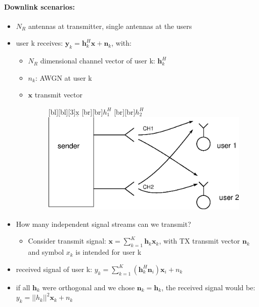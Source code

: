\documentclass[a4paper, 10pt]{article}
\begin{document}
\paragraph{Downlink scenarios:}
\begin{itemize}
	\item $N_R $ antennas at transmitter, single antennas at the users
	\item user k receives: $ \mathbf{y}_k = \mathbf{h}_k^H\mathbf{x} + \mathbf{n}_k $, with:
	\begin{itemize}
		\item $N_R $ dimensional channel vector of user k: $\mathbf{h}_k^H $
		\item $n_k$: AWGN at user k
		\item $\mathbf{x} $ transmit vector  
	\begin{figure}[ht]
		\centering
		[bl][bl][3]{$\underline{\text{x}}$}
		[br][br]{$h_1^H$}
		[br][br]{$h_2^H$}
		\includegraphics[scale=0.8]{BroadcastChannel_scenario.eps}
	\end{figure}
	\end{itemize}
	\item How many independent signal streams can we transmit?
	\begin{itemize}
		\item Consider transmit signal: $\mathbf{x} = \sum\limits_{k = 1}^{K}\mathbf{h}_k\mathbf{x}_k $, with TX transmit vector $\mathbf{n}_k $ and symbol $x_k $ is intended for user k
	\end{itemize}
	\item received signal of user k: $y_k = \sum\limits_{k = 1}^{K}(\mathbf{h}_k^H\mathbf{n}_i)\mathbf{x}_i + n_k $
	\item if all $\mathbf{h}_k $ were orthogonal and we chose $\mathbf{n}_k = \mathbf{h}_k $, the received signal would be: \\ $y_k = ||h_k||^2\mathbf{x}_k + n_k $

\end{itemize}
\end{document}

